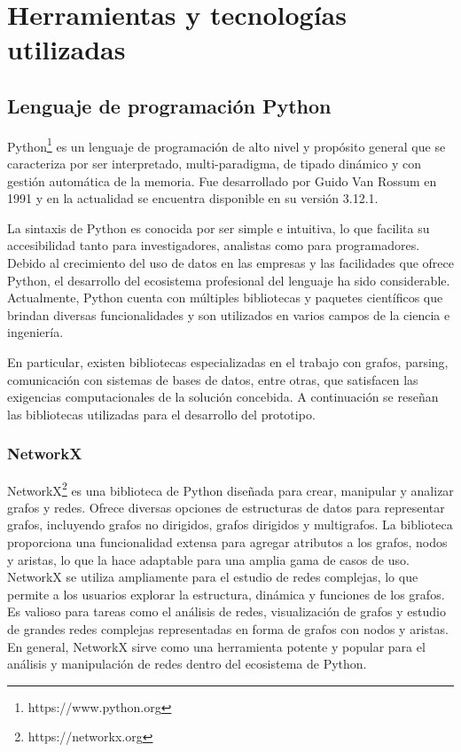 \section{Herramientas y tecnologías utilizadas}\label{section:tools}

\subsection{Lenguaje de programaci\'on Python}

Python\footnote{https://www.python.org} es un lenguaje de programación de alto nivel y propósito general que se caracteriza por ser 
interpretado, multi-paradigma, de tipado dinámico y con gestión automática de la memoria. Fue desarrollado 
por Guido Van Rossum en 1991 y en la actualidad se encuentra disponible en su versión 3.12.1.

La sintaxis de Python es conocida por ser simple e intuitiva, lo que facilita su accesibilidad tanto para 
investigadores, analistas como para programadores. Debido al crecimiento del uso de datos en las empresas y 
las facilidades que ofrece Python, el desarrollo del ecosistema profesional del lenguaje ha sido considerable. 
Actualmente, Python cuenta con múltiples bibliotecas y paquetes científicos que brindan diversas funcionalidades 
y son utilizados en varios campos de la ciencia e ingeniería.

En particular, existen bibliotecas especializadas en el trabajo con grafos, parsing, comunicación 
con sistemas de bases de datos, entre otras, que satisfacen las exigencias computacionales de la 
soluci\'on concebida. A continuación se reseñan las bibliotecas utilizadas para el desarrollo del prototipo.

\subsubsection{NetworkX}

NetworkX\footnote{https://networkx.org} es una biblioteca de Python diseñada para crear, manipular y analizar 
grafos y redes. Ofrece diversas 
opciones de estructuras de datos para representar grafos, incluyendo grafos no dirigidos, grafos dirigidos y 
multigrafos. La biblioteca proporciona una funcionalidad extensa para agregar atributos a los grafos, nodos y 
aristas, lo que la hace adaptable para una amplia gama de casos de uso. NetworkX se utiliza ampliamente para 
el estudio de redes complejas, lo que permite a los usuarios explorar la estructura, dinámica y funciones de 
los grafos. Es valioso para tareas como el análisis de redes, visualización de grafos y estudio de grandes 
redes complejas representadas en forma de grafos con nodos y aristas. En general, NetworkX sirve como una 
herramienta potente y popular para el análisis y manipulación de redes dentro del ecosistema de Python.

